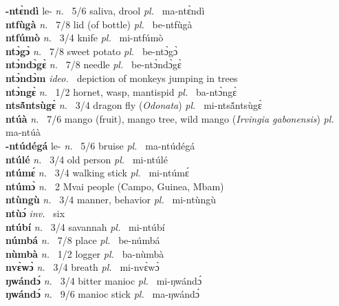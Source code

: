 {\bfseries -ntɛ̀ndì} le- {\itshape n.~} 5/6 saliva, drool {\itshape pl.~} ma-ntɛ̀ndì    \\ 
{\bfseries ntfùgà}  {\itshape n.~} 7/8 lid (of bottle) {\itshape pl.~} be-ntfùgà    \\ 
{\bfseries ntfúmò}  {\itshape n.~} 3/4 knife {\itshape pl.~} mi-ntfúmò    \\ 
{\bfseries ntɔ̀gɔ̀}  {\itshape n.~} 7/8 sweet potato {\itshape pl.~} be-ntɔ̀gɔ̀   \\ 
{\bfseries ntɔ̀ndɔ̀gɛ̀}  {\itshape n.~} 7/8 needle {\itshape pl.~} be-ntɔ̀ndɔ̀gɛ̀    \\ 
{\bfseries ntɔ̀ndɔ̀m}  {\itshape ideo.~} depiction of monkeys jumping in trees    \\ 
{\bfseries ntɔ̀ngɛ̀}  {\itshape n.~} 1/2 hornet, wasp, mantispid {\itshape pl.~} ba-ntɔ̀ngɛ̀    \\ 
{\bfseries ntsã́ntsùgɛ̀}  {\itshape n.~} 3/4 dragon fly ({\itshape Odonata}) {\itshape pl.~} mi-ntsã́ntsùgɛ̀    \\ 
{\bfseries ntúà}  {\itshape n.~} 7/6 mango (fruit),  mango tree, wild mango ({\itshape Irvingia gabonensis}) {\itshape pl.~} ma-ntúà    \\ 
{\bfseries -ntúdégá} le- {\itshape n.~} 5/6 bruise {\itshape pl.~} ma-ntúdégá    \\ 
{\bfseries ntúlé}  {\itshape n.~} 3/4 old person {\itshape pl.~} mi-ntúlé    \\ 
{\bfseries ntúmɛ́}  {\itshape n.~} 3/4 walking stick {\itshape pl.~} mi-ntúmɛ́    \\ 
{\bfseries ntúmɔ̀}  {\itshape n.~} 2 Mvai people (Campo, Guinea, Mbam)    \\ 
{\bfseries ntùngù}  {\itshape n.~} 3/4 manner, behavior {\itshape pl.~} mi-ntùngù    \\ 
{\bfseries ntùɔ́}  {\itshape inv.~} six    \\ 
{\bfseries ntúbí}  {\itshape n.~} 3/4 savannah {\itshape pl.~} mi-ntúbí    \\ 
{\bfseries númbá}  {\itshape n.~} 7/8 place {\itshape pl.~} be-númbá    \\ 
{\bfseries nùmbà}  {\itshape n.~} 1/2 logger {\itshape pl.~} ba-nùmbà    \\ 
{\bfseries nvɛ̀wɔ̀}  {\itshape n.~} 3/4 breath {\itshape pl.~} mi-nvɛ̀wɔ̀    \\ 
{\bfseries ŋwándɔ́}  {\itshape n.~} 3/4 bitter manioc {\itshape pl.~} mi-ŋwándɔ́    \\ 
{\bfseries ŋwándɔ́}  {\itshape n.~} 9/6 manioc stick {\itshape pl.~} ma-ŋwándɔ́    \\ 
